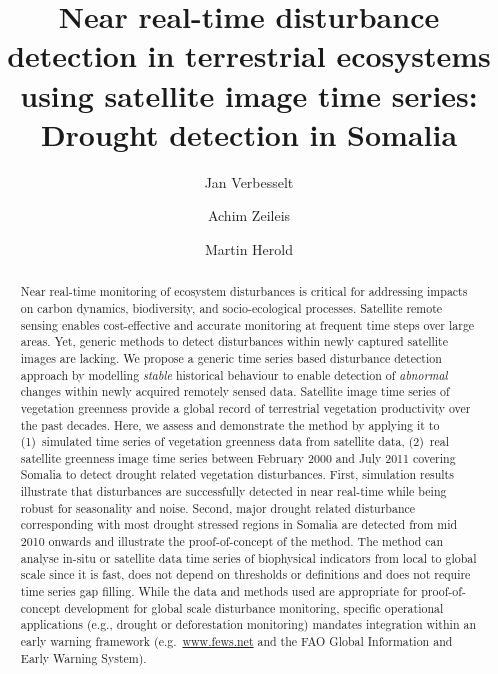 \documentclass[authoryear,preprint,review,10pt]{elsarticle}
\begin{document}

\begin{frontmatter}

    \title
    {
Near real-time disturbance detection in terrestrial ecosystems using satellite image time series: \\ Drought detection in Somalia
    }
    \author[WUR]{Jan Verbesselt}
    \author[UIBK]{Achim Zeileis}
    \author[WUR]{Martin Herold}
    \address[WUR]{Remote Sensing Team, Wageningen University, \\
           Droevendaalsesteeg 3, Wageningen 6708 PB, The Netherlands \\
           \emph{Ph}: + 31 317 48 52 68; \emph{Fax}: +31 317 419000}
    \address[UIBK]{Department of Statistics, Universit\"at Innsbruck \\
           Universit\"atsstr.~15, A-6020 Innsbruck, Austria}

\begin{abstract}
Near real-time monitoring of ecosystem disturbances is critical for addressing impacts on carbon dynamics, biodiversity, and socio-ecological processes. Satellite remote sensing enables cost-effective and accurate monitoring at frequent time steps over large areas. Yet, generic methods to detect disturbances within newly captured satellite images are lacking. 
We propose a generic time series based disturbance detection approach by modelling \emph{stable} historical behaviour to enable detection of \emph{abnormal} changes within newly acquired remotely sensed data.
Satellite image time series of vegetation greenness provide a global record of terrestrial vegetation productivity over the past decades. Here, we assess and demonstrate the method by applying it to (1)~simulated time series of vegetation greenness data from satellite data, (2)~real satellite greenness image time series between February 2000 and July 2011 covering Somalia to  detect drought related vegetation disturbances.
First, simulation results illustrate that disturbances are successfully detected in near real-time while being robust for seasonality and noise. Second, major drought related disturbance corresponding with most drought stressed regions in Somalia are detected from mid 2010 onwards and illustrate the proof-of-concept of the method. The method can analyse in-situ or satellite data time series of biophysical indicators from local to global scale since it is fast, does not depend on thresholds or definitions and does not require time series gap filling. While the data and methods used are appropriate for proof-of-concept development for global scale disturbance monitoring, specific operational applications (e.g., drought or deforestation monitoring) mandates integration within an early warning framework (e.g.\ \url{www.fews.net} and the FAO Global Information and Early Warning System).
\end{abstract}



\end{frontmatter}
\end{document}
